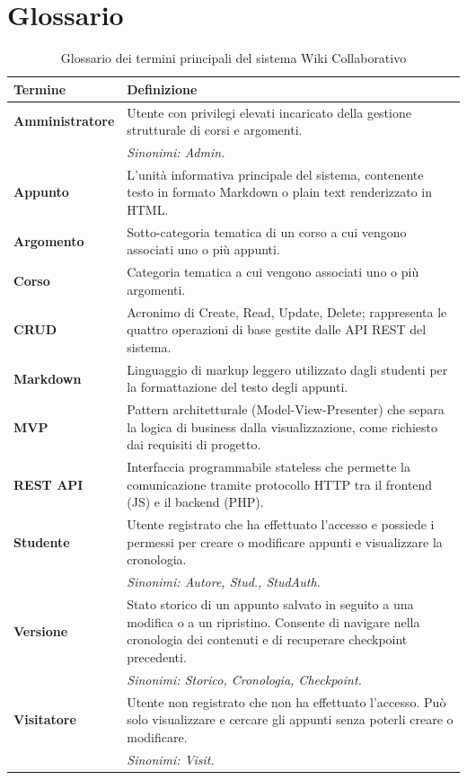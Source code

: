 \chapter{Glossario}
\newpage
\begin{table}[H]
    \small
    \centering
    \caption{Glossario dei termini principali del sistema Wiki Collaborativo}
    \label{tab:glossario}
    \begin{tabularx}{\textwidth}{@{}l X@{}}
        \toprule
        \textbf{Termine} & \textbf{Definizione} \\
        \midrule
        \textbf{Amministratore} & Utente con privilegi elevati incaricato della gestione strutturale di corsi e argomenti. \\
        & \textit{Sinonimi: Admin.} \\
        \midrule
        \textbf{Appunto} & L'unità informativa principale del sistema, contenente testo in formato Markdown o plain text renderizzato in HTML. \\
        \midrule
        \textbf{Argomento} & Sotto-categoria tematica di un corso a cui vengono associati uno o più appunti. \\
        \midrule
        \textbf{Corso} & Categoria tematica a cui vengono associati uno o più argomenti. \\
        \midrule
        \textbf{CRUD} & Acronimo di Create, Read, Update, Delete; rappresenta le quattro operazioni di base gestite dalle API REST del sistema. \\
        \midrule
        \textbf{Markdown} & Linguaggio di markup leggero utilizzato dagli studenti per la formattazione del testo degli appunti. \\
        \midrule
        \textbf{MVP} & Pattern architetturale (Model-View-Presenter) che separa la logica di business dalla visualizzazione, come richiesto dai requisiti di progetto. \\
        \midrule
        \textbf{REST API} & Interfaccia programmabile stateless che permette la comunicazione tramite protocollo HTTP tra il frontend (JS) e il backend (PHP). \\
        \midrule
        \textbf{Studente} & Utente registrato che ha effettuato l'accesso e possiede i permessi per creare o modificare appunti e visualizzare la cronologia. \\
        & \textit{Sinonimi: Autore, Stud., StudAuth.} \\
        \midrule
        \textbf{Versione} & Stato storico di un appunto salvato in seguito a una modifica o a un ripristino. Consente di navigare nella cronologia dei contenuti e di recuperare checkpoint precedenti. \\
        & \textit{Sinonimi: Storico, Cronologia, Checkpoint.} \\
        \midrule
        \textbf{Visitatore} & Utente non registrato che non ha effettuato l'accesso. Può solo visualizzare e cercare gli appunti senza poterli creare o modificare. \\
        & \textit{Sinonimi: Visit.} \\
        \bottomrule
    \end{tabularx}
\end{table}